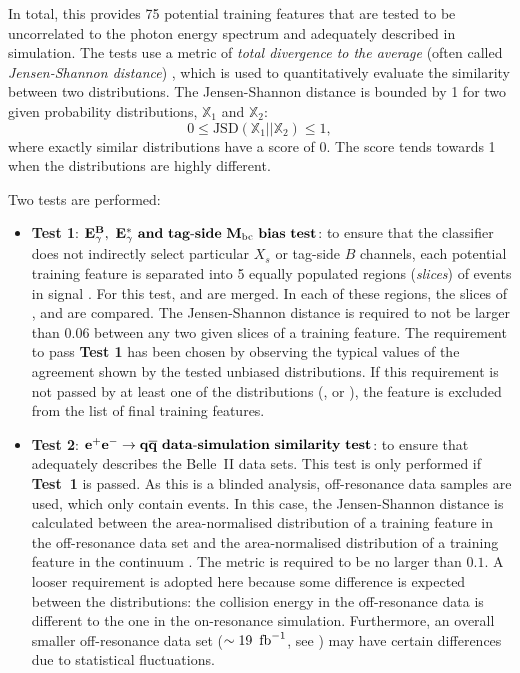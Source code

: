 In total, this provides 75 potential training features that are tested to be uncorrelated to the photon energy spectrum and adequately described in simulation.
The tests use a metric of \textit{total divergence to the average} (often called \textit{Jensen-Shannon distance}) \cite{Lin:1991abc},
which is used to quantitatively evaluate the similarity between two distributions.
The Jensen-Shannon distance is bounded by 1 for two given probability distributions, $\mathbb{X}_1$ and $\mathbb{X}_2$:
\begin{equation}\label{eq:js_distance}
    0\leq\mathrm{JSD}(\mathbb{X}_1||\mathbb{X}_2) \leq1,
\end{equation}
where exactly similar distributions have a score of 0. 
The score tends towards 1 when the distributions are highly different.

Two tests are performed:
\begin{itemize}
    \item \textbf{Test 1}: $\mathbf{{E^B_{\gamma}},~{E^*_{\gamma}}~and~tag\mbox{-}side~{M_{\mathrm{bc}}}~bias~test}$:
    to ensure that the classifier does not indirectly select particular $X_s$ or tag-side $B$ channels,
    each potential training feature is separated into 5 equally populated regions (\textit{slices}) of \BtoXsgamma events in signal \MC.
    For this test, \BptoXsgamma and \BztoXsgamma are merged.
    In each of these regions, the slices of \EB, \Estar and \Mbc are compared.
    The Jensen-Shannon distance is required to not be larger than $0.06$ between any two given slices of a training feature.
    The requirement to pass \textbf{Test 1} has been chosen by observing the typical values of the agreement shown by the tested unbiased distributions.
    If this requirement is not passed by at least one of the distributions (\EB, \Estar or \Mbc), the feature is excluded from the list of final \BDT training features.
    \item \textbf{Test 2}: $\mathbf{e^+e^-\rightarrow q\overline q~data\mbox{-}simulation~similarity~test}$:
    to ensure that \MC adequately describes the Belle~II data sets.
    This test is only performed if \textbf{Test~1} is passed.
    As this is a blinded analysis, off-resonance data samples are used, which only contain \epem\ra\qqbar events.
    In this case, the Jensen-Shannon distance is calculated between 
    the area-normalised distribution of a training feature in the off-resonance data set
    and the area-normalised distribution of a training feature in the continuum \MC.
    The metric is required to be no larger than $0.1$.
    A looser requirement is adopted here because some difference is expected between the distributions:
    the collision energy in the off-resonance data is different to the one in the on-resonance simulation.
    Furthermore, an overall smaller off-resonance data set ($\sim19~\mbox{\,fb}^{-1}$, see ) may have certain differences due to statistical fluctuations.
\end{itemize}

